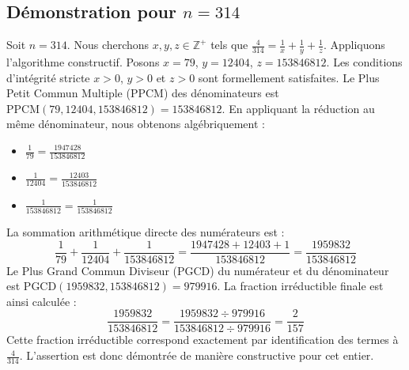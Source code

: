 \documentclass[11pt,a4paper]{article}
\begin{document}
\subsection{Démonstration pour $n = 314$}
Soit $n = 314$. Nous cherchons $x, y, z \in \mathbb{Z}^{+}$ tels que $\frac{4}{314} = \frac{1}{x} + \frac{1}{y} + \frac{1}{z}$.
Appliquons l'algorithme constructif. Posons $x = 79$, $y = 12404$, $z = 153846812$.
Les conditions d'intégrité stricte $x > 0$, $y > 0$ et $z > 0$ sont formellement satisfaites.
Le Plus Petit Commun Multiple (PPCM) des dénominateurs est $\text{PPCM}(79, 12404, 153846812) = 153846812$.
En appliquant la réduction au même dénominateur, nous obtenons algébriquement :
\begin{itemize}
    \item $\frac{1}{79} = \frac{1947428}{153846812}$
    \item $\frac{1}{12404} = \frac{12403}{153846812}$
    \item $\frac{1}{153846812} = \frac{1}{153846812}$
\end{itemize}
La sommation arithmétique directe des numérateurs est :
$$ \frac{1}{79} + \frac{1}{12404} + \frac{1}{153846812} = \frac{1947428 + 12403 + 1}{153846812} = \frac{1959832}{153846812} $$
Le Plus Grand Commun Diviseur (PGCD) du numérateur et du dénominateur est $\text{PGCD}(1959832, 153846812) = 979916$.
La fraction irréductible finale est ainsi calculée :
$$ \frac{1959832}{153846812} = \frac{1959832 \div 979916}{153846812 \div 979916} = \frac{2}{157} $$
Cette fraction irréductible correspond exactement par identification des termes à $\frac{4}{314}$. L'assertion est donc démontrée de manière constructive pour cet entier.
\end{document}
